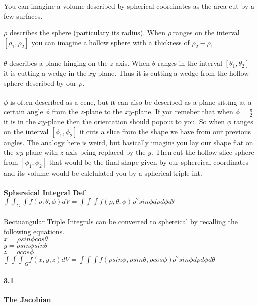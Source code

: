 \documentclass[14pt]{extreport}
\begin{document}
You can imagine a volume described by spherical coordinates as the area cut by a few surfaces.

$\rho$ describes the sphere (particulary its radius). When $\rho$ ranges on the interval $[\rho_1, \rho_2]$ you can imagine a hollow sphere with a thickness of $\rho_2 - \rho_1$\\\\

$\theta$ describes a plane hinging on the $z$ axis. When $\theta$ ranges in the interval $[\theta_1, \theta_2]$ it is cutting a wedge in the $xy$-plane. Thus it is cutting a wedge from the hollow sphere described by our $\rho$.\\\\

$\phi$ is often described as a cone, but it can also be described as a plane sitting at a certain angle $\phi$ from the $z$-plane to the $xy$-plane. If you remeber that when $\phi = \frac{\pi}{2}$ it is in the $xy$-plane then the orientation should popout to you.
So when $\phi$ ranges on the interval $[\phi_1, \phi_2]$ it cuts a slice from the shape we have from our previous angles. The analogy here is weird, but basically
imagine you lay our shape flat on the $xy$-plane with $z$-axis being replaced by the $y$. Then cut the hollow slice sphere from $[\phi_1, \phi_2]$ that would be the final shape given by our sphereical coordinates
and its volume would be calclulated you by a spherical triple int.\\\\

\textbf{Sphereical Integral Def:} $\int\int_G\int f(\rho, \theta, \phi)dV = \int\int\int f(\rho, \theta, \phi)\rho^2sin\phi d\rho d\phi d\theta$\\\\

Rectuangular Triple Integrals can be converted to sphereical by recalling the following equations.\\
$x = \rho sin\phi cos \theta$\\
$y = \rho sin \phi sin \theta$\\
$z = \rho cos\phi$\\

${\int\int\int}_G f(x, y, z)dV = \int\int\int f(\rho sin \phi, \rho sin \theta, \rho cos \phi)\rho^2 sin\phi d\rho d\phi d\theta$\\

\paragraph{3.1} \textbf{The Jacobian}\\
\end{document}
